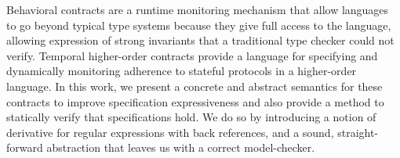 Behavioral contracts are a runtime monitoring mechanism that allow languages to go beyond typical type systems because they give full access to the language, allowing expression of strong invariants that a traditional type checker could not verify.
%
Temporal higher-order contracts provide a language for specifying and dynamically monitoring adherence to stateful protocols in a higher-order language.
%
In this work, we present a concrete and abstract semantics for these contracts to improve specification expressiveness and also provide a method to statically verify that specifications hold.
%
We do so by introducing a notion of derivative for regular expressions with back references, and a sound, straight-forward abstraction that leaves us with a correct model-checker.